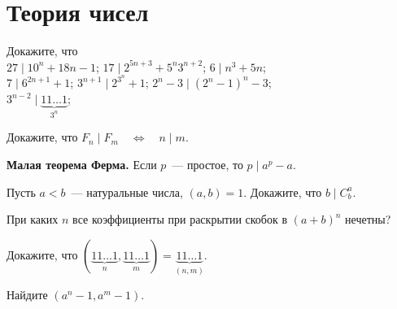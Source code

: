 

\section*{Теория чисел}


\begin{problems}

\item
Докажите, что
\\[0.3ex]
\sbp $27 \mid 10^n + 18 n - 1$;
\qquad
\sbp $17 \mid 2^{5n+3} + 5^n 3^{n+2}$;
\qquad
\sbp $6 \mid n^3 + 5 n$;
\\[0.5ex]
\sbp $7 \mid 6^{2n+1} + 1$;
\qquad
\sbp $3^{n+1} \mid 2^{3^n} + 1$;
\qquad
\sbp $2^n-3 \mid (2^n - 1)^n-3$;
\\[0.5ex]
\sbp $3^{n-2} \mid \underbrace{11 \ldots 1}_{3^n}$;

\item
Докажите, что $F_n \mid F_m \quad\Leftrightarrow\quad n \mid m$.

\item\textbf{Малая теорема Ферма.}
Если $p$~--- простое, то $p \mid a^p - a$.

\item
Пусть $a < b$~--- натуральные числа, $(a, b) = 1$.
Докажите, что $b \mid C^a_b$.

\item
При каких $n$ все коэффициенты при раскрытии скобок в $(a + b)^n$ нечетны?

\item
Докажите, что
\(
    (\underbrace{11 \ldots 1}_{n}, \underbrace{11 \ldots 1}_{m})
=
    \underbrace{11 \ldots 1}_{(n,m)}
\).

\item
Найдите $(a^n - 1, a^m - 1)$.

\end{problems}

